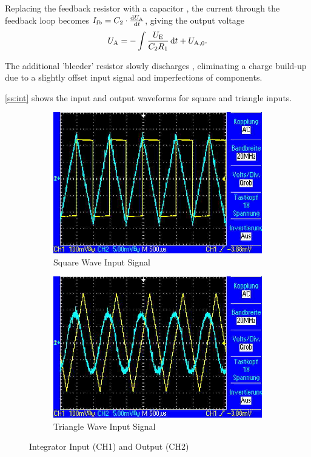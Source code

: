 Replacing the feedback resistor  with a capacitor , the current through the feedback loop becomes $I_\text{fb} = C_2 \cdot \frac{\mathop{}\!\mathrm{d} U_\text{A}}{\mathop{}\!\mathrm{d} t}$, giving the output voltage \[U_\text{A} = - \int \frac{U_\text{E}}{C_2 R_1} \mathop{}\!\mathrm{d} t + {U_\text{A}}_{,0}.\]

The additional 'bleeder' resistor  slowly discharges , eliminating a charge build-up due to a slightly offset input signal and imperfections of components.

\autoref{ss:int} shows the input and output waveforms for square and triangle inputs.

\begin{figure}
	\centering
	\begin{subfigure}{0.4\textwidth}
		\centering
		\includegraphics[width=.9\linewidth]{./img/ss-int-1.jpg}
		\caption{Square Wave Input Signal}
	\end{subfigure}
	\begin{subfigure}{0.4\textwidth}
		\centering
		\includegraphics[width=.9\linewidth]{./img/ss-int-2.jpg}
		\caption{Triangle Wave Input Signal}
	\end{subfigure}
	\caption{Integrator Input (CH1) and Output (CH2)}
	\label{ss:int}
\end{figure}

